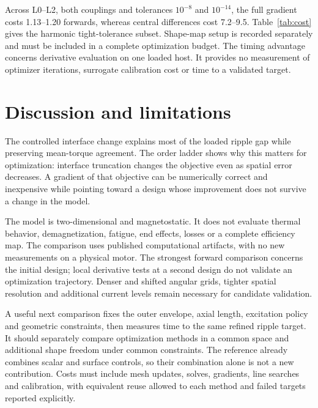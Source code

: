 \documentclass{anvil-paper}
\begin{document}
Across L0--L2, both couplings and tolerances $10^{-8}$ and $10^{-14}$, the
full gradient costs 1.13--1.20 forwards, whereas central differences cost
7.2--9.5. Table~\ref{tab:cost} gives the harmonic tight-tolerance subset.
Shape-map setup is recorded separately and must be included in a complete
optimization budget. The timing advantage concerns derivative evaluation
on one loaded host. It provides no measurement of optimizer iterations,
surrogate calibration cost or time to a validated target.

\begin{table}[htbp]\centering\small
\caption{Recorded harmonic-model cost at relative tolerance $10^{-14}$,
initial design and full current. Times are seconds for ten-angle sweeps;
setup is a one-time shape-map cost.}
\label{tab:cost}
\end{table}

\section{Discussion and limitations}
The controlled interface change explains most of the loaded ripple gap
while preserving mean-torque agreement. The order ladder shows why this
matters for optimization: interface truncation changes the objective even
as spatial error decreases. A gradient of that objective can be
numerically correct and inexpensive while pointing toward a design whose
improvement does not survive a change in the model.

The model is two-dimensional and magnetostatic. It does not evaluate
thermal behavior, demagnetization, fatigue, end effects, losses or a
complete efficiency map. The comparison uses published computational
artifacts, with no new measurements on a physical motor. The strongest
forward comparison concerns the initial design; local derivative tests
at a second design do not validate an optimization trajectory. Denser
and shifted angular grids, tighter spatial resolution and additional
current levels remain necessary for candidate validation.

A useful next comparison fixes the outer envelope, axial length, excitation
policy and geometric constraints, then measures time to the same refined
ripple target. It should separately compare optimization methods in a
common space and additional shape freedom under common constraints.
The reference already combines scalar and surface controls, so their
combination alone is not a new contribution. Costs must include mesh
updates, solves, gradients, line searches and calibration, with equivalent
reuse allowed to each method and failed targets reported explicitly.
\end{document}
